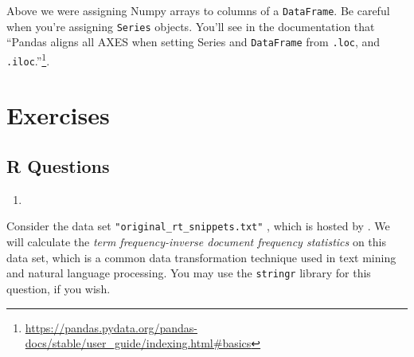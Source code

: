 \documentclass[12pt,krantz2]{krantz}
\renewcommand{\href}[2]{#2\footnote{\url{#1}}}
\begin{document}
\begin{rmd-caution}
Above we were assigning Numpy arrays to columns of a \texttt{DataFrame}. Be careful when you're assigning \texttt{Series} objects. You'll see in the documentation that \href{https://pandas.pydata.org/pandas-docs/stable/user_guide/indexing.html\#basics}{``Pandas aligns all AXES when setting Series and \texttt{DataFrame} from \texttt{.loc}, and \texttt{.iloc}.''}.

\end{rmd-caution}

\hypertarget{exercises-6}{%
\section{Exercises}\label{exercises-6}}

\hypertarget{r-questions-6}{%
\subsection{R Questions}\label{r-questions-6}}

\begin{enumerate}
\def\labelenumi{\arabic{enumi}.}
\item
\end{enumerate}

Consider the data set \texttt{"original\_rt\_snippets.txt"} \citep{SocherEtAl2013:RNTN}, which is hosted by \citep{uci_data}. We will calculate the \emph{term frequency-inverse document frequency statistics} \citep{Jones72astatistical} on this data set, which is a common data transformation technique used in text mining and natural language processing. You may use the \texttt{stringr} library for this question, if you wish.
\end{document}
